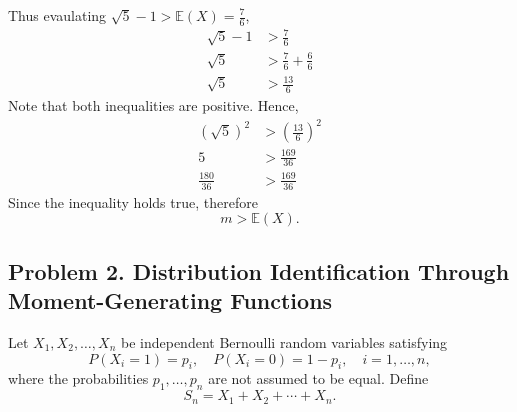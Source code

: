 \documentclass[letterpaper,12pt]{article}
\begin{document}
\begin{enumerate}[(a)]
\begin{list}{}{}
        Thus evaulating $\sqrt{5} - 1 > \mathbb{E}(X) = \frac{7}{6}$,
        \begin{align*}
        \sqrt{5} - 1 &> \frac{7}{6} \\
        \sqrt{5} &> \frac{7}{6} + \frac{6}{6} \\
        \sqrt{5} &> \frac{13}{6}
        \end{align*}
        Note that both inequalities are positive. Hence,
        \begin{align*}
        (\sqrt{5})^2 &> \left(\frac{13}{6}\right)^2 \\
        5 &> \frac{169}{36} \\
        \frac{180}{36} &> \frac{169}{36}
        \end{align*}
        Since the inequality holds true, therefore 
        \[  \boxed{{m > \mathbb{E}(X)}.} \]
    \end{list}
\end{enumerate}
\vspace{1.5em}

\subsection*{Problem 2. Distribution Identification Through\\ Moment-Generating Functions \hfill \mdseries[12 points]}
Let $X_1, X_2, \dots, X_n$ be independent Bernoulli random variables satisfying
\[P(X_i = 1) = p_i, \quad P(X_i = 0) = 1 - p_i, \quad i = 1, \dots, n,\]
where the probabilities $p_1, \dots, p_n$ are not assumed to be equal. Define
\[S_n = X_1 + X_2 + \cdots + X_n.\]
\end{document}
